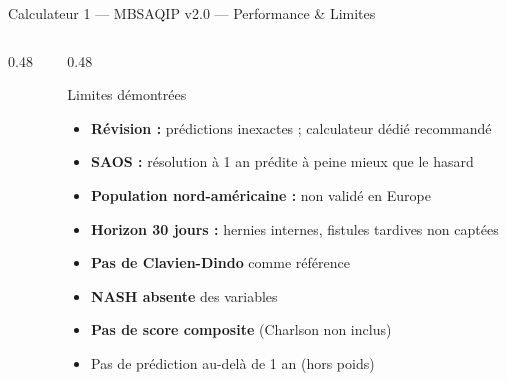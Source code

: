 \documentclass[aspectratio=169]{beamer}
\newcommand{\tightlist}{%
  \setlength{\itemsep}{1pt}\setlength{\parskip}{0pt}%
  \setlength{\parsep}{0pt}\setlength{\topsep}{2pt}}
\begin{document}
\begin{frame}[shrink=5]{Calculateur 1 --- MBSAQIP v2.0 --- Performance \& Limites}
\begin{columns}[T]
\begin{column}{0.48\textwidth}
    \end{column}
    \begin{column}{0.48\textwidth}
      \begin{alertblock}{Limites démontrées}
        \footnotesize\tightlist
        \begin{itemize}\tightlist
          \item \textbf{Révision :} prédictions inexactes ; calculateur dédié recommandé
          \item \textbf{SAOS :} résolution à 1 an prédite à peine mieux que le hasard
          \item \textbf{Population nord-américaine :} non validé en Europe
          \item \textbf{Horizon 30 jours :} hernies internes, fistules tardives non captées
          \item \textbf{Pas de Clavien-Dindo} comme référence
          \item \textbf{NASH absente} des variables
          \item \textbf{Pas de score composite} (Charlson non inclus)
          \item Pas de prédiction au-delà de 1 an (hors poids)
        \end{itemize}
      \end{alertblock}
    \end{column}
  \end{columns}
\end{frame}
\end{document}
